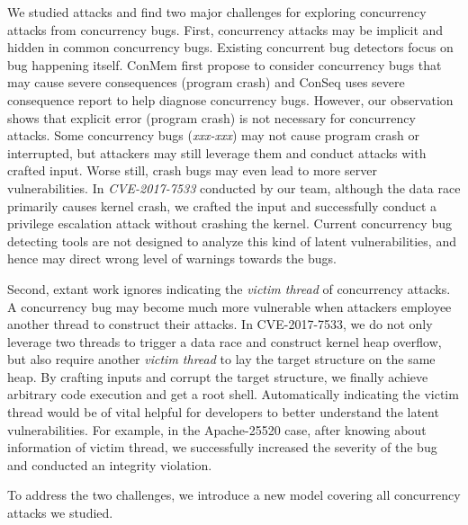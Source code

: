 We studied \nattacks attacks and find two major challenges for exploring concurrency attacks from concurrency bugs. 
First, concurrency attacks may be implicit and hidden in common concurrency bugs. 
Existing concurrent bug detectors focus on bug happening itself. 
ConMem\cite{conmem:asplos10} first propose to 
consider concurrency bugs that may cause severe consequences (\eg program crash)
and ConSeq\cite{conseq:asplos11} uses severe consequence report to help diagnose concurrency bugs. 
However, our observation shows that explicit error (\eg program crash) is not necessary for concurrency 
attacks. Some concurrency bugs (\eg \emph{xxx-xxx}) may not cause program crash or interrupted, 
but attackers may still leverage them and conduct attacks with crafted input. 
%
Worse still, crash bugs may even lead to more server vulnerabilities. 
In \emph{CVE-2017-7533} conducted by our team, although the data race primarily causes kernel crash, 
we crafted the input and successfully conduct a privilege escalation attack without crashing the kernel.
Current concurrency bug detecting tools are not designed to analyze this kind of latent vulnerabilities, 
and hence may direct wrong level of warnings towards the bugs.  


Second, extant work ignores indicating the \emph{victim thread} of concurrency attacks.
A concurrency bug may become much more vulnerable when attackers employee another thread to construct 
their attacks. 
In CVE-2017-7533, we do not only leverage two threads to trigger a data race and construct kernel heap overflow, 
but also require another \emph{victim thread} to lay the target structure on the same heap. 
By crafting inputs and corrupt the target structure, we finally achieve arbitrary code execution and get a root shell. 
Automatically indicating the victim thread would be of vital helpful for developers to better understand the latent vulnerabilities.
For example, in the Apache-25520 case, after knowing about information of victim thread, 
we successfully increased the severity of the bug and conducted an integrity violation.


To address the two challenges, we introduce a new model covering all concurrency attacks we studied. 











